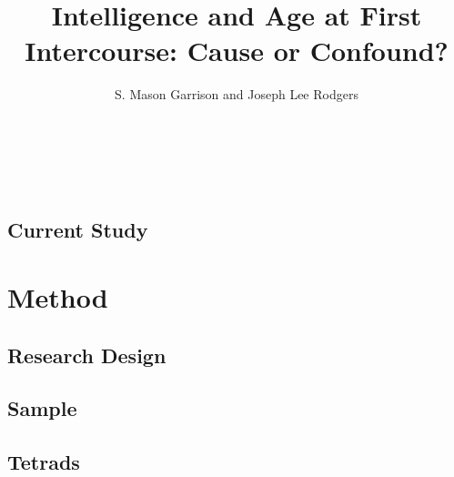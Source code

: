 \documentclass[a4paper,man,apacite,natbib,12pt,longtable]{apa6}\usepackage[]{graphicx}\usepackage[]{color}
\title{Intelligence and Age at First Intercourse: Cause or Confound?}
\author{S. Mason Garrison and Joseph Lee Rodgers}
\affiliation{Vanderbilt University}
\begin{document}
\maketitle
%











\section{ }\vspace{-.8cm}
\\


\\

\subsection{Current Study}


\section{Method}
\subsection{Research Design}

%
\subsection{Sample}

%
\subsection{Tetrads}

%
\end{document}
